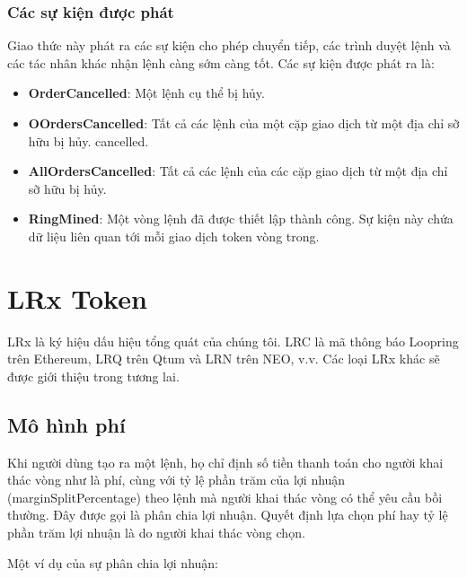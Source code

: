 \documentclass[12pt,a4paper]{article}
\makeatletter
\newenvironment{figurehere}
 {\def\@captype{figure}}
 {}
\makeatother
\begin{document}
\begin{multicols}{2}
\subsubsection{Các sự kiện được phát\label{sec:events}}
Giao thức này phát ra các sự kiện cho phép chuyển tiếp, các trình duyệt lệnh và các tác nhân khác nhận lệnh càng sớm càng tốt. Các sự kiện được phát ra là:
\begin{itemize}
	\item \textbf{OrderCancelled}: Một lệnh cụ thể bị hủy.
	\item \textbf{OOrdersCancelled}: Tất cả các lệnh của một cặp giao dịch từ một địa chỉ sỡ hữu bị hủy.  cancelled.
	\item \textbf{AllOrdersCancelled}: Tất cả các lệnh của các cặp giao dịch từ một địa chỉ sỡ hữu bị hủy.
	\item \textbf{RingMined}: Một vòng lệnh đã được thiết lập thành công. Sự kiện này chứa dữ liệu liên quan tới mỗi  giao dịch token vòng trong.
\end{itemize}

\section{LRx Token\label{sec:token}}
LRx là ký hiệu dấu hiệu tổng quát của chúng tôi. LRC là mã thông báo Loopring trên Ethereum, LRQ trên Qtum và LRN trên NEO, v.v. Các loại LRx khác sẽ được giới thiệu trong tương lai.

\subsection{Mô hình phí\label{sec:fee_model}}
Khi người dùng tạo ra một lệnh, họ chỉ định số tiền thanh toán cho người khai thác vòng như là phí, cùng với tỷ lệ phần trăm của lợi nhuận (marginSplitPercentage) theo lệnh mà người khai thác vòng có thể yêu cầu bồi thường. Đây được gọi là phân chia lợi nhuận. Quyết định lựa chọn phí hay tỷ lệ phần trăm lợi nhuận là do người khai thác vòng chọn.

Một ví dụ của sự phân chia lợi nhuận:
\begin{center}
\begin{figurehere}
\centering
{}
\end{figurehere}
\end{center}
\end{multicols}
\end{document}
